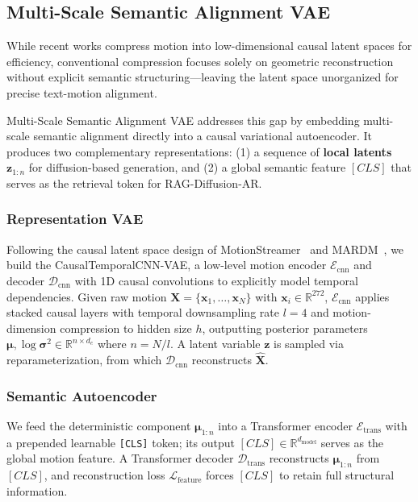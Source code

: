 \documentclass{article}
\begin{document}
\subsection{Multi-Scale Semantic Alignment VAE }
\label{sec:msa-vae}

While recent works \citep{meng2024rethinking, meng2025absolute, xiao2025motionstreamer} compress motion into low-dimensional causal latent spaces for efficiency, conventional compression focuses solely on geometric reconstruction without explicit semantic structuring---leaving the latent space unorganized for precise text-motion alignment.

Multi-Scale Semantic Alignment VAE addresses this gap by embedding multi-scale semantic alignment directly into a causal
variational autoencoder. It produces two complementary representations:
(1) a sequence of \textbf{local latents} \(\mathbf{z}_{1:n}\) for diffusion-based generation, and
(2) a global semantic feature $[CLS]$ that serves as the retrieval token
for RAG-Diffusion-AR.

\subsubsection{Representation VAE}

Following the causal latent space design of MotionStreamer~\citep{xiao2025motionstreamer}
and MARDM~\citep{meng2024rethinking}, we build the CausalTemporalCNN-VAE, a low-level motion encoder
\(\mathcal{E}_{\text{cnn}}\) and decoder \(\mathcal{D}_{\text{cnn}}\) with 1D causal convolutions
to explicitly model temporal dependencies. Given raw motion
\(\mathbf{X} = \{\mathbf{x}_1, \dots, \mathbf{x}_N\}\) with \(\mathbf{x}_i \in \mathbb{R}^{272}\),
\(\mathcal{E}_{\text{cnn}}\) applies stacked causal layers with temporal downsampling rate
\(l = 4\) and motion-dimension compression to hidden size \(h\), outputting posterior parameters
\(\boldsymbol{\mu}, \log\boldsymbol{\sigma}^2 \in \mathbb{R}^{n \times d_c}\) where \(n = N/l\).
A latent variable \(\mathbf{z}\) is sampled via reparameterization, from which
\(\mathcal{D}_{\text{cnn}}\) reconstructs \(\hat{\mathbf{X}}\).

\subsubsection{Semantic Autoencoder}

We feed the deterministic component \(\boldsymbol{\mu}_{1:n}\) into a Transformer encoder
\(\mathcal{E}_{\text{trans}}\) with a prepended learnable \texttt{[CLS]} \citep{devlin2019bert} token;
its output \([CLS] \in \mathbb{R}^{d_{\text{model}}}\) serves as the global motion feature.
A Transformer decoder \(\mathcal{D}_{\text{trans}}\) reconstructs \(\boldsymbol{\mu}_{1:n}\) from \([CLS]\),
and reconstruction loss \(\mathcal{L}_{\text{feature}}\) forces \([CLS]\) to retain full structural information.
\end{document}
